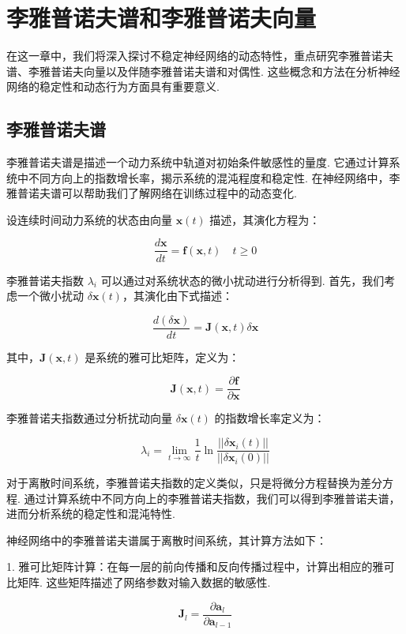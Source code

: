 
\chapter{李雅普诺夫谱和李雅普诺夫向量}

在这一章中，我们将深入探讨不稳定神经网络的动态特性，重点研究李雅普诺夫谱、李雅普诺夫向量以及伴随李雅普诺夫谱和对偶性. 这些概念和方法在分析神经网络的稳定性和动态行为方面具有重要意义. 

\section{李雅普诺夫谱}

李雅普诺夫谱是描述一个动力系统中轨道对初始条件敏感性的量度. 它通过计算系统中不同方向上的指数增长率，揭示系统的混沌程度和稳定性. 在神经网络中，李雅普诺夫谱可以帮助我们了解网络在训练过程中的动态变化. 

设连续时间动力系统的状态由向量 \(\mathbf{x}(t)\) 描述，其演化方程为：

\[ \frac{d\mathbf{x}}{dt} = \mathbf{f}(\mathbf{x}, t) \quad t\geq 0 \]

李雅普诺夫指数 \(\lambda_i\) 可以通过对系统状态的微小扰动进行分析得到. 首先，我们考虑一个微小扰动 \(\delta \mathbf{x}(t)\)，其演化由下式描述：

\[ \frac{d (\delta \mathbf{x})}{dt} = \mathbf{J}(\mathbf{x}, t) \delta \mathbf{x} \]

其中，\(\mathbf{J}(\mathbf{x}, t)\) 是系统的雅可比矩阵，定义为：

\[ \mathbf{J}(\mathbf{x}, t) = \frac{\partial \mathbf{f}}{\partial \mathbf{x}} \]

李雅普诺夫指数通过分析扰动向量 \(\delta \mathbf{x}(t)\) 的指数增长率定义为：

\[ \lambda_i = \lim_{t \to \infty} \frac{1}{t} \ln \frac{||\delta \mathbf{x}_i(t)||}{||\delta \mathbf{x}_i(0)||} \]

对于离散时间系统，李雅普诺夫指数的定义类似，只是将微分方程替换为差分方程. 通过计算系统中不同方向上的李雅普诺夫指数，我们可以得到李雅普诺夫谱，进而分析系统的稳定性和混沌特性. 

神经网络中的李雅普诺夫谱属于离散时间系统，其计算方法如下：

1. 雅可比矩阵计算：在每一层的前向传播和反向传播过程中，计算出相应的雅可比矩阵. 这些矩阵描述了网络参数对输入数据的敏感性. 

\[ \mathbf{J}_l = \frac{\partial \mathbf{a}_l}{\partial \mathbf{a}_{l-1}} \]


